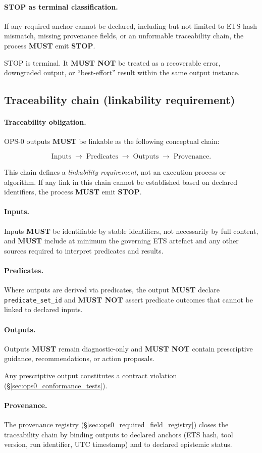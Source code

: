 \paragraph{STOP as terminal classification.}
If any required anchor cannot be declared,
including but not limited to
ETS hash mismatch,
missing provenance fields,
or an unformable traceability chain,
the process \textbf{MUST} emit \textbf{STOP}.

STOP is terminal.
It \textbf{MUST NOT} be treated
as a recoverable error,
downgraded output,
or ``best-effort'' result
within the same output instance.

\subsection{Traceability chain (linkability requirement)}
\paragraph{Traceability obligation.}
OPS-0 outputs \textbf{MUST}
be linkable as the following
conceptual chain:

\[
\text{Inputs}
\;\rightarrow\;
\text{Predicates}
\;\rightarrow\;
\text{Outputs}
\;\rightarrow\;
\text{Provenance}.
\]

This chain defines a \emph{linkability requirement},
not an execution process or algorithm.
If any link in this chain cannot be established
based on declared identifiers,
the process \textbf{MUST} emit \textbf{STOP}.

\paragraph{Inputs.}
Inputs \textbf{MUST}
be identifiable by stable identifiers,
not necessarily by full content,
and \textbf{MUST} include at minimum
the governing ETS artefact
and any other sources required
to interpret predicates and results.

\paragraph{Predicates.}
Where outputs are derived via predicates,
the output \textbf{MUST} declare
\texttt{predicate\_set\_id}
and \textbf{MUST NOT}
assert predicate outcomes
that cannot be linked
to declared inputs.

\paragraph{Outputs.}
Outputs \textbf{MUST}
remain diagnostic-only and
\textbf{MUST NOT}
contain prescriptive guidance,
recommendations,
or action proposals.

Any prescriptive output
constitutes a contract violation
(\S\ref{sec:ops0_conformance_tests}).

\paragraph{Provenance.}
The provenance registry
(\S\ref{sec:ops0_required_field_registry})
closes the traceability chain
by binding outputs to declared anchors
(ETS hash, tool version, run identifier,
UTC timestamp)
and to declared epistemic status.

